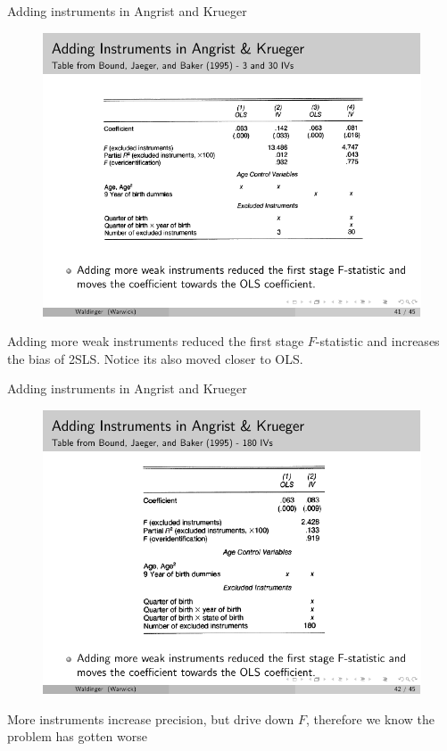 \documentclass{beamer}
\begin{document}
\begin{frame}{Adding instruments in Angrist and Krueger}

  \begin{figure}
    \includegraphics{./lecture_includes/ak_iv1.pdf}
  \end{figure}

  Adding more weak instruments reduced the first stage $F$-statistic and increases the bias of 2SLS. Notice its also moved closer to OLS.

\end{frame}

\begin{frame}{Adding instruments in Angrist and Krueger}

  \begin{figure}
    \includegraphics{./lecture_includes/ak_iv2.pdf}
  \end{figure}

  More instruments increase precision, but drive down $F$, therefore we know the problem has gotten worse

\end{frame}
\end{document}
